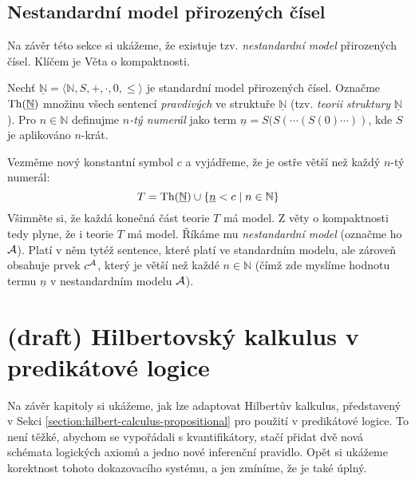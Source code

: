 \subsection{Nestandardní model přirozených čísel}

Na závěr této sekce si ukážeme, že existuje tzv. \emph{nestandardní model} přirozených čísel. Klíčem je Věta o kompaktnosti.
    
Nechť $\underline{\mathbb N}=\langle\mathbb N,S,+,\cdot,0,\leq\rangle$ je standardní model přirozených čísel. Označme $\operatorname{Th}(\underline{\mathbb N})$ množinu všech sentencí \emph{pravdivých} ve struktuře $\underline{\mathbb N}$ (tzv. \emph{teorii struktury} $\underline{\mathbb N}$). Pro $n\in \mathbb N$ definujme \emph{$n$-tý numerál} jako term $\underline n=S(S(\cdots (S(0)\cdots))$, kde $S$ je aplikováno $n$-krát.

Vezměme nový konstantní symbol $c$ a vyjádřeme, že je ostře větší než každý $n$-tý numerál:
$$
T=\operatorname{Th}(\underline{\mathbb N})\cup\{\underline n<c\mid n\in \mathbb N\}
$$
Všimněte si, že každá konečná část teorie $T$ má model. Z věty o kompaktnosti tedy plyne, že i teorie $T$ má model. Říkáme mu \emph{nestandardní model} (označme ho $\mathcal{A}$). Platí v něm tytéž sentence, které platí ve standardním modelu, ale zároveň obsahuje prvek $c^{\mathcal{A}}$, který je větší než každé $n\in \mathbb N$ (čímž zde myslíme hodnotu termu $\underline n$ v nestandardním modelu $\mathcal{A}$).
    

\section{(draft) Hilbertovský kalkulus v predikátové logice}
\todo

Na závěr kapitoly si ukážeme, jak lze adaptovat Hilbertův kalkulus, představený v Sekci \ref{section:hilbert-calculus-propositional} pro použití v predikátové logice. To není těžké, abychom se vypořádali s kvantifikátory, stačí přidat dvě nová schémata logických axiomů a jedno nové inferenční pravidlo. Opět si ukážeme korektnost tohoto dokazovacího systému, a jen zmíníme, že je také úplný.

